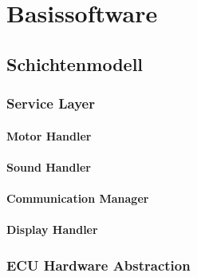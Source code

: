 \chapter{Basissoftware}


\section{Schichtenmodell}



\subsection{Service Layer}


\subsubsection{Motor Handler}


\subsubsection{Sound Handler}


\subsubsection{Communication Manager}


\subsubsection{Display Handler}


\subsection{ECU Hardware Abstraction}


